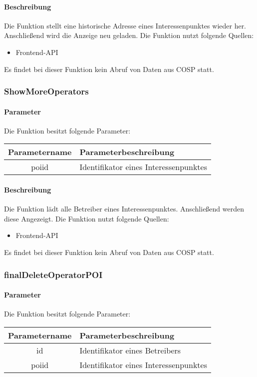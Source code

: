 \paragraph{Beschreibung} Die Funktion stellt eine historische Adresse eines Interessenpunktes wieder her. Anschließend wird die Anzeige neu geladen. Die Funktion nutzt folgende Quellen:
\begin{itemize}
	\item Frontend-API
\end{itemize}
Es findet bei dieser Funktion kein Abruf von Daten aus {\glqq COSP\grqq} statt.
\subsubsection{ShowMoreOperators}
\paragraph{Parameter} Die Funktion besitzt folgende Parameter:
\begin{table}[H]
	\begin{tabular}{|c|p{11cm}|}
		\hline
		\textbf{Parametername} & \textbf{Parameterbeschreibung} \\ \hline
		poiid & Identifikator eines Interessenpunktes \\ \hline
	\end{tabular}
\end{table}
\paragraph{Beschreibung} Die Funktion lädt alle Betreiber eines Interessenpunktes. Anschließend werden diese Angezeigt. Die Funktion nutzt folgende Quellen:
\begin{itemize}
	\item Frontend-API
\end{itemize}
Es findet bei dieser Funktion kein Abruf von Daten aus {\glqq COSP\grqq} statt.
\subsubsection{finalDeleteOperatorPOI}
\paragraph{Parameter} Die Funktion besitzt folgende Parameter:
\begin{table}[H]
	\begin{tabular}{|c|p{11cm}|}
		\hline
		\textbf{Parametername} & \textbf{Parameterbeschreibung} \\ \hline
		id    & Identifikator eines Betreibers \\ \hline
		poiid & Identifikator eines Interessenpunktes \\ \hline
	\end{tabular}
\end{table}

